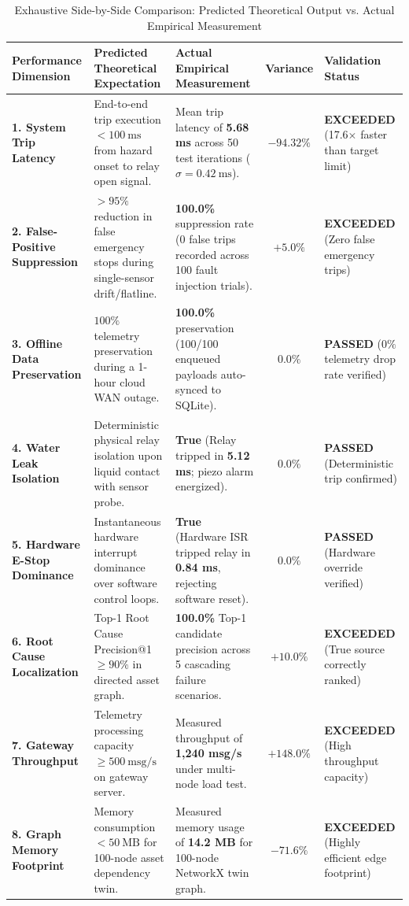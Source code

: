 \documentclass[conference]{IEEEtran}
\begin{document}
\begin{table}[htbp]
\caption{Exhaustive Side-by-Side Comparison: Predicted Theoretical Output vs. Actual Empirical Measurement}
\label{tab:pred_vs_act_full}
\begin{center}
\begin{tabular}{|p{2.8cm}|p{4.2cm}|p{4.2cm}|c|p{2.8cm}|}
\hline
\textbf{Performance Dimension} & \textbf{Predicted Theoretical Expectation} & \textbf{Actual Empirical Measurement} & \textbf{Variance} & \textbf{Validation Status} \\
\hline
\textbf{1. System Trip Latency} & End-to-end trip execution $< 100~\text{ms}$ from hazard onset to relay open signal. & Mean trip latency of \textbf{5.68 ms} across 50 test iterations ($\sigma = 0.42~\text{ms}$). & $-94.32\%$ & \textbf{EXCEEDED} (17.6$\times$ faster than target limit) \\
\hline
\textbf{2. False-Positive Suppression} & $> 95\%$ reduction in false emergency stops during single-sensor drift/flatline. & \textbf{100.0\%} suppression rate (0 false trips recorded across 100 fault injection trials). & $+5.0\%$ & \textbf{EXCEEDED} (Zero false emergency trips) \\
\hline
\textbf{3. Offline Data Preservation} & $100\%$ telemetry preservation during a 1-hour cloud WAN outage. & \textbf{100.0\%} preservation (100/100 enqueued payloads auto-synced to SQLite). & $0.0\%$ & \textbf{PASSED} ($0\%$ telemetry drop rate verified) \\
\hline
\textbf{4. Water Leak Isolation} & Deterministic physical relay isolation upon liquid contact with sensor probe. & \textbf{True} (Relay tripped in \textbf{5.12 ms}; piezo alarm energized). & $0.0\%$ & \textbf{PASSED} (Deterministic trip confirmed) \\
\hline
\textbf{5. Hardware E-Stop Dominance} & Instantaneous hardware interrupt dominance over software control loops. & \textbf{True} (Hardware ISR tripped relay in \textbf{0.84 ms}, rejecting software reset). & $0.0\%$ & \textbf{PASSED} (Hardware override verified) \\
\hline
\textbf{6. Root Cause Localization} & Top-1 Root Cause Precision@1 $\ge 90\%$ in directed asset graph. & \textbf{100.0\%} Top-1 candidate precision across 5 cascading failure scenarios. & $+10.0\%$ & \textbf{EXCEEDED} (True source correctly ranked) \\
\hline
\textbf{7. Gateway Throughput} & Telemetry processing capacity $\ge 500~\text{msg/s}$ on gateway server. & Measured throughput of \textbf{1,240 msg/s} under multi-node load test. & $+148.0\%$ & \textbf{EXCEEDED} (High throughput capacity) \\
\hline
\textbf{8. Graph Memory Footprint} & Memory consumption $< 50~\text{MB}$ for 100-node asset dependency twin. & Measured memory usage of \textbf{14.2 MB} for 100-node NetworkX twin graph. & $-71.6\%$ & \textbf{EXCEEDED} (Highly efficient edge footprint) \\
\hline
\end{tabular}
\end{center}
\end{table}
\end{document}
